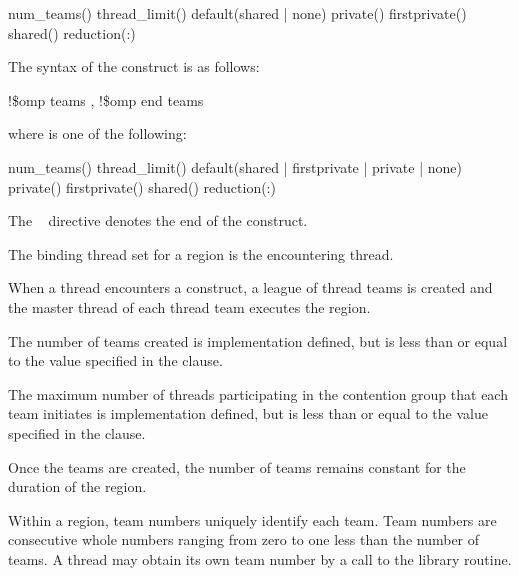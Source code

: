 \begin{indentedcodelist}
num\_teams()
thread\_limit()
default(shared \textnormal{|} none)
private()
firstprivate()
shared()
reduction(:)
\end{indentedcodelist}
\ccppspecificend

\fortranspecificstart
The syntax of the  construct is as follows:

\begin{boxedcode}
!\$omp teams \plc{[clause[ [},\plc{] clause] ... ]}
!\$omp end teams
\end{boxedcode}

where  is one of the following:

\begin{indentedcodelist}
num\_teams()
thread\_limit()
default(shared \textnormal{|} firstprivate \textnormal{|} private \textnormal{|} none)
private()
firstprivate()
shared()
reduction(:)
\end{indentedcodelist}

The ~ directive denotes the end of the  construct.
\fortranspecificend

\binding
The binding thread set for a  region is the encountering thread.

\descr
When a thread encounters a  construct, a league of thread teams is created and 
the master thread of each thread team executes the  region.

The number of teams created is implementation defined, but is less than or equal to the 
value specified in the  clause.

The maximum number of threads participating in the contention group that each team 
initiates is implementation defined, but is less than or equal to the value specified in the 
 clause.

Once the teams are created, the number of teams remains constant for the duration of the 
 region.

Within a  region, team numbers uniquely identify each team. Team numbers are 
consecutive whole numbers ranging from zero to one less than the number of teams. A 
thread may obtain its own team number by a call to the  library 
routine.

